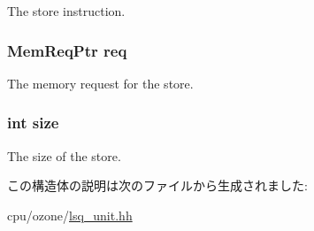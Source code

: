 \label{structOzoneLSQ_1_1SQEntry_af5d4fb974eeb4507d4c837d365d0cefc}
The store instruction. \hypertarget{structOzoneLSQ_1_1SQEntry_a129d82cb393847d581480530d3be9486}{
\subsubsection[{req}]{\setlength{\rightskip}{0pt plus 5cm}MemReqPtr {\bf req}}}
\label{structOzoneLSQ_1_1SQEntry_a129d82cb393847d581480530d3be9486}
The memory request for the store. \hypertarget{structOzoneLSQ_1_1SQEntry_a439227feff9d7f55384e8780cfc2eb82}{
\subsubsection[{size}]{\setlength{\rightskip}{0pt plus 5cm}int {\bf size}}}
\label{structOzoneLSQ_1_1SQEntry_a439227feff9d7f55384e8780cfc2eb82}
The size of the store. 

この構造体の説明は次のファイルから生成されました:\begin{DoxyCompactItemize}
\item 
cpu/ozone/\hyperlink{ozone_2lsq__unit_8hh}{lsq\_\-unit.hh}\end{DoxyCompactItemize}
